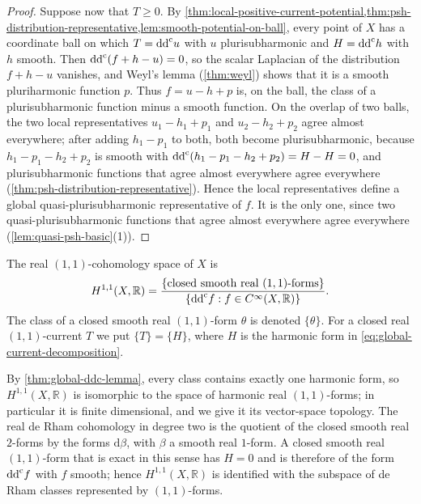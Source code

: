 \begin{proof}
Suppose now that $T\geq0$. By \cref{thm:local-positive-current-potential,thm:psh-distribution-representative,lem:smooth-potential-on-ball}, every point of $X$ has a coordinate ball on which $T=\mathrm{dd}^{\mathrm{c}} u$ with $u$ plurisubharmonic and $H=\mathrm{dd}^{\mathrm{c}} h$ with $h$ smooth. Then $\mathrm{dd}^{\mathrm{c}}(f+h-u)=0$, so the scalar Laplacian of the distribution $f+h-u$ vanishes, and Weyl's lemma (\cref{thm:weyl}) shows that it is a smooth pluriharmonic function $p$. Thus $f=u-h+p$ is, on the ball, the class of a plurisubharmonic function minus a smooth function. On the overlap of two balls, the two local representatives $u_1-h_1+p_1$ and $u_2-h_2+p_2$ agree almost everywhere; after adding $h_1-p_1$ to both, both become plurisubharmonic, because $h_1-p_1-h_2+p_2$ is smooth with $\mathrm{dd}^{\mathrm{c}}(h_1-p_1-h_2+p_2)=H-H=0$, and plurisubharmonic functions that agree almost everywhere agree everywhere (\cref{thm:psh-distribution-representative}). Hence the local representatives define a global quasi-plurisubharmonic representative of $f$. It is the only one, since two quasi-plurisubharmonic functions that agree almost everywhere agree everywhere (\cref{lem:quasi-psh-basic}(1)).
\end{proof}

\begin{definition}\label{def:real-one-one-cohomology}
The real $(1,1)$-cohomology space of $X$ is
\[
 H^{1,1}(X,\mathbb R)=
 \frac{\{\text{closed smooth real $(1,1)$-forms}\}}
      {\{\mathrm{dd}^{\mathrm{c}} f:f\in C^\infty(X,\mathbb R)\}}.
\]
The class of a closed smooth real $(1,1)$-form $\theta$ is denoted $\{\theta\}$. For a closed real $(1,1)$-current $T$ we put $\{T\}=\{H\}$, where $H$ is the harmonic form in \eqref{eq:global-current-decomposition}.
\end{definition}
By \cref{thm:global-ddc-lemma}, every class contains exactly one harmonic form, so $H^{1,1}(X,\mathbb R)$ is isomorphic to the space of harmonic real $(1,1)$-forms; in particular it is finite dimensional, and we give it its vector-space topology. The real de Rham cohomology in degree two is the quotient of the closed smooth real $2$-forms by the forms $\mathrm d\beta$, with $\beta$ a smooth real $1$-form. A closed smooth real $(1,1)$-form that is exact in this sense has $H=0$ and is therefore of the form $\mathrm{dd}^{\mathrm{c}} f$ with $f$ smooth; hence $H^{1,1}(X,\mathbb R)$ is identified with the subspace of de Rham classes represented by $(1,1)$-forms.

